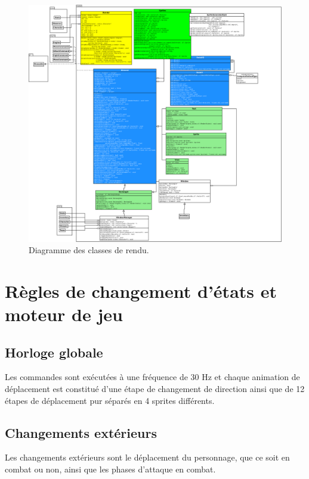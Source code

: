 \documentclass[a4paper,12pt]{article}
\begin{document}
\newpage
\begin{figure}[p]
    \centering
    \includegraphics[width=\textwidth,height=\textheight,keepaspectratio]{render.png}
    \caption{\label{uml:render}Diagramme des classes de rendu.}
\end{figure}

\newpage
\begin{minipage}{\linewidth}

\end{minipage}

\newpage
\section{Règles de changement d'états et moteur de jeu}

\subsection{Horloge globale}
	Les commandes sont exécutées à une fréquence de 30 Hz et chaque animation de déplacement est constitué d'une étape de changement de direction ainsi que de 12 étapes de déplacement pur séparés en 4 sprites différents.


\subsection{Changements extérieurs}
	Les changements extérieurs sont le déplacement du personnage, que ce soit en combat ou non, ainsi que les phases d'attaque en combat.
\end{document}
